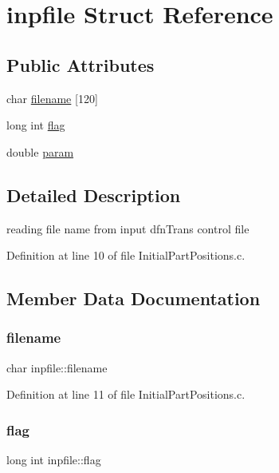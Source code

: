 \hypertarget{structinpfile}{}\section{inpfile Struct Reference}
\label{structinpfile}
\subsection*{Public Attributes}
\begin{DoxyCompactItemize}
\item 
char \mbox{\hyperlink{structinpfile_a66e8759aa38ee20350f04cdc58dee702}{filename}} \mbox{[}120\mbox{]}
\item 
long int \mbox{\hyperlink{structinpfile_a23ae60bf94767194de9a09a4eee8cc1d}{flag}}
\item 
double \mbox{\hyperlink{structinpfile_a57ff2cce78c35a8a128927da9eeccfbc}{param}}
\end{DoxyCompactItemize}


\subsection{Detailed Description}
reading file name from input dfn\+Trans control file 

Definition at line 10 of file Initial\+Part\+Positions.\+c.



\subsection{Member Data Documentation}
\mbox{\label{structinpfile_a66e8759aa38ee20350f04cdc58dee702}} 
\subsubsection{\texorpdfstring{filename}{filename}}
{\footnotesize\ttfamily char inpfile\+::filename}



Definition at line 11 of file Initial\+Part\+Positions.\+c.

\mbox{\label{structinpfile_a23ae60bf94767194de9a09a4eee8cc1d}} 
\subsubsection{\texorpdfstring{flag}{flag}}
{\footnotesize\ttfamily long int inpfile\+::flag}



